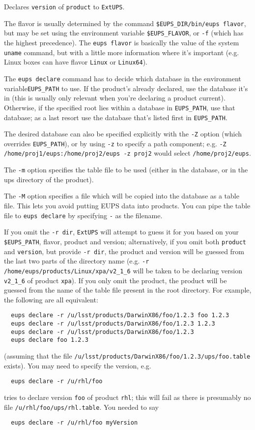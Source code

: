 \documentclass{article}
\newcommand{\code}[1]{\texttt{#1}}
\newcommand{\eups}{\code{ExtUPS}}
\begin{document}
\begin{itemize}
Declares \code{version} of \code{product} to \eups.

The flavor is usually determined by the command \code{\$EUPS\_DIR/bin/eups flavor},
but may be set using the
environment variable \code{\$EUPS\_FLAVOR}, or \code{-f} (which has the highest
precedence).  The \code{eups flavor} is basically the value of the system \code{uname}
command, but with a little more information where it's important (e.g. Linux boxes
can have flavor \code{Linux} or \code{Linux64}).

The \code{eups declare} command has to decide which database in the environment
variable\code{EUPS\_PATH}
to use.  If the product's already declared, use the database it's in (this is usually
only relevant when you're declaring a product current).  Otherwise, if the specified root
lies within a database in \code{EUPS\_PATH}, use that database; as a last resort use
the database that's listed first in \code{EUPS\_PATH}.

The desired database can also be specified
explicitly with the \code{-Z} option (which overrides \code{EUPS\_PATH}), or by using \code{-z}
to specify a path component; e.g.
\code{-Z /home/proj1/eups:/home/proj2/eups -z proj2} would select \code{/home/proj2/eups}.

The \code{-m} option specifies the table
file to be used (either in the database, or in the ups directory of the product).

The \code{-M} option specifies a file which will be copied into the
database as a table file. This lets you avoid putting EUPS data
into products. You can pipe the table file to \code{eups declare} by
specifying \code{-} as the filename.

If you omit the \code{-r dir}, \eups{} will attempt to guess it for you based
on your \code{\$EUPS\_PATH}, flavor, product and version; alternatively,
if you omit both \code{product} and \code{version}, but provide \code{-r dir},
the product and version will be guessed from the last two parts of the directory
name (e.g. \code{-r /home/eups/products/Linux/xpa/v2\_1\_6} will be taken to be
declaring version \code{v2\_1\_6} of product \code{xpa}).  If you only omit
the product, the product will be guessed from the name of the table file
present in the root directory. For example, the following are all equivalent:
\begin{verbatim}
  eups declare -r /u/lsst/products/DarwinX86/foo/1.2.3 foo 1.2.3
  eups declare -r /u/lsst/products/DarwinX86/foo/1.2.3 1.2.3
  eups declare -r /u/lsst/products/DarwinX86/foo/1.2.3
  eups declare foo 1.2.3
\end{verbatim}
(assuming that the file \code{/u/lsst/products/DarwinX86/foo/1.2.3/ups/foo.table}
exists). You may need to specify the version, e.g.
\begin{verbatim}
  eups declare -r /u/rhl/foo
\end{verbatim}
tries to declare version \code{foo} of product \code{rhl}; this will fail as
there is presumably no file \code{/u/rhl/foo/ups/rhl.table}.  You needed to say
\begin{verbatim}
  eups declare -r /u/rhl/foo myVersion
\end{verbatim}


\end{itemize}
\end{document}
